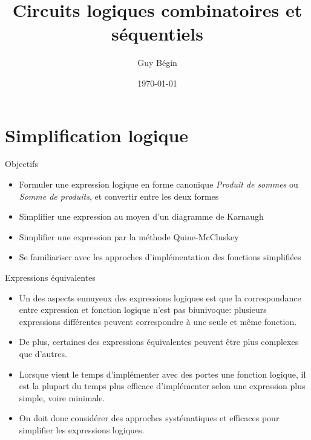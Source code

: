 \documentclass[presentation]{beamer}
\author{Guy Bégin}
\date{\today}
\title{Circuits logiques combinatoires et séquentiels}
\begin{document}
\maketitle

\section{Simplification logique}
\label{sec:org173a0cb}

\begin{frame}[label={sec:org2a5c35b}]{Objectifs}
\begin{itemize}
\item Formuler une expression logique en forme canonique \emph{Produit
de sommes} ou \emph{Somme de produits}, et convertir entre les deux formes
\item Simplifier une expression au moyen d'un diagramme de
Karnaugh
\item Simplifier une expression par la méthode Quine-McCluskey
\item Se familiariser avec les approches d'implémentation des fonctions
simplifiées
\end{itemize}
\end{frame}

\begin{frame}[label={sec:org7b24e2a}]{Expressions équivalentes}
\begin{itemize}
\item Un des aspects ennuyeux des expressions logiques est que la correspondance entre expression et fonction logique n'est pas biunivoque: plusieurs expressions différentes peuvent correspondre à une seule et même fonction.

\item De plus, certaines des expressions équivalentes peuvent être plus complexes que d'autres.

\item Lorsque vient le temps d'implémenter avec des portes une fonction logique, il est la plupart du temps plus efficace d'implémenter selon une expression plus simple, voire minimale.

\item On doit donc considérer des approches systématiques et efficaces pour simplifier les expressions logiques.
\end{itemize}
\end{frame}
\end{document}
